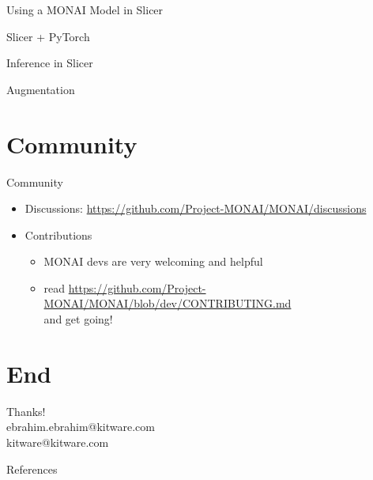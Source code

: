 \documentclass[10pt,aspectratio=169,dvipsnames]{beamer}
\begin{document}
\begin{frame}{Using a MONAI Model in Slicer}
\end{frame}

\begin{frame}{Slicer + PyTorch}
\end{frame}

\begin{frame}{Inference in Slicer}
\end{frame}

\begin{frame}{Augmentation}
\end{frame}


\section{Community}

\begin{frame}{Community}
\begin{itemize}
	\item Discussions: \url{https://github.com/Project-MONAI/MONAI/discussions}
	\item Contributions
	\begin{itemize}
		\item MONAI devs are very welcoming and helpful
		\item read \url{https://github.com/Project-MONAI/MONAI/blob/dev/CONTRIBUTING.md}\\and get going!
	\end{itemize}
\end{itemize}
\end{frame}


\section{End}



\begin{frame}[standout]
\centering
{\huge Thanks!}\\
ebrahim.ebrahim@kitware.com\\
kitware@kitware.com\\
\vspace{1cm}
\end{frame}


\begin{frame}[allowframebreaks]{References}
\printbibliography
\end{frame}
\end{document}
